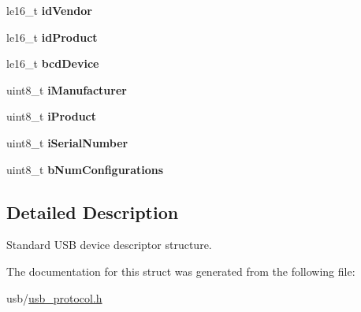 \begin{DoxyCompactItemize}
le16\+\_\+t {\bfseries id\+Vendor}
\item 
\mbox{\label{structusb__dev__desc_af68593cfb6cac9526461200fdad845f7}} 
le16\+\_\+t {\bfseries id\+Product}
\item 
\mbox{\label{structusb__dev__desc_ab01c138f454ddf1250ec5cb7e189bae0}} 
le16\+\_\+t {\bfseries bcd\+Device}
\item 
\mbox{\label{structusb__dev__desc_a902dec0cde91adef0dbcb6cbfb9f7bb8}} 
uint8\+\_\+t {\bfseries i\+Manufacturer}
\item 
\mbox{\label{structusb__dev__desc_adad4d231826bc025e5b7828eaa30a4d5}} 
uint8\+\_\+t {\bfseries i\+Product}
\item 
\mbox{\label{structusb__dev__desc_af66bdfe2f7c8382cd7fe9225b14af016}} 
uint8\+\_\+t {\bfseries i\+Serial\+Number}
\item 
\mbox{\label{structusb__dev__desc_a89109e9ecc7b1c07f42018fb2155471a}} 
uint8\+\_\+t {\bfseries b\+Num\+Configurations}
\end{DoxyCompactItemize}


\subsection{Detailed Description}
Standard U\+SB device descriptor structure. 

The documentation for this struct was generated from the following file\+:\begin{DoxyCompactItemize}
\item 
usb/\hyperlink{usb__protocol_8h}{usb\+\_\+protocol.\+h}\end{DoxyCompactItemize}
